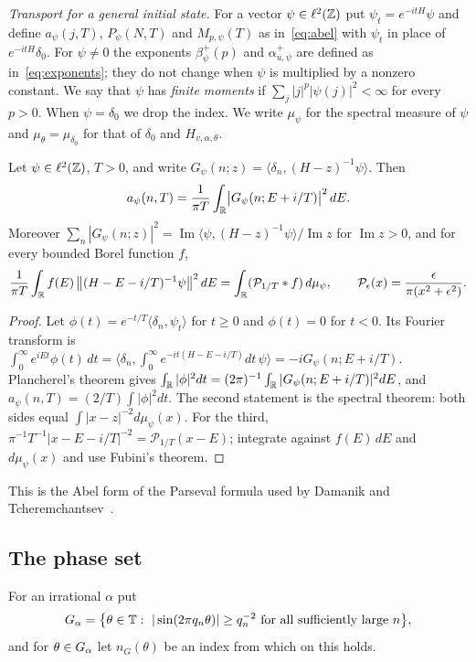 \emph{Transport for a general initial state.} For a vector $\psi\in\ell^2(\mathbb Z)$ put $\psi_t=e^{-itH}\psi$ and define $a_\psi(j,T)$, $P_\psi(N,T)$ and $M_{p,\psi}(T)$ as in~\eqref{eq:abel} with $\psi_t$ in place of $e^{-itH}\delta_0$. For $\psi\ne0$ the exponents $\beta^+_\psi(p)$ and $\alpha^+_{u,\psi}$ are defined as in~\eqref{eq:exponents}; they do not change when $\psi$ is multiplied by a nonzero constant. We say that $\psi$ has \emph{finite moments} if $\sum_j|j|^p|\psi(j)|^2<\infty$ for every $p>0$. When $\psi=\delta_0$ we drop the index. We write $\mu_\psi$ for the spectral measure of $\psi$ and $\mu_\theta=\mu_{\delta_0}$ for that of $\delta_0$ and $H_{v,\alpha,\theta}$.

\begin{lemma}[Parseval]\label{lem:parseval}
Let $\psi\in\ell^2(\mathbb Z)$, $T>0$, and write $G_\psi(n;z)=\langle\delta_n,(H-z)^{-1}\psi\rangle$. Then
\[
a_\psi(n,T)=\frac1{\pi T}\int_\mathbb R\bigl|G_\psi(n;E+i/T)\bigr|^2\,dE .
\]
Moreover $\sum_n|G_\psi(n;z)|^2=\operatorname{Im}\langle\psi,(H-z)^{-1}\psi\rangle/\operatorname{Im}z$ for $\operatorname{Im}z>0$, and for every bounded Borel function $f$,
\[
\frac1{\pi T}\int_\mathbb R f(E)\,\bigl\|(H-E-i/T)^{-1}\psi\bigr\|^2\,dE=\int_\mathbb R(\mathcal P_{1/T}*f)\,d\mu_\psi,\qquad \mathcal P_\epsilon(x)=\frac{\epsilon}{\pi(x^2+\epsilon^2)} .
\]
\end{lemma}

\begin{proof}
Let $\phi(t)=e^{-t/T}\langle\delta_n,\psi_t\rangle$ for $t\ge0$ and $\phi(t)=0$ for $t<0$. Its Fourier transform is $\int_0^\infty e^{iEt}\phi(t)\,dt=\langle\delta_n,\int_0^\infty e^{-it(H-E-i/T)}dt\,\psi\rangle=-iG_\psi(n;E+i/T)$. Plancherel's theorem gives $\int_\mathbb R|\phi|^2dt=(2\pi)^{-1}\int_\mathbb R|G_\psi(n;E+i/T)|^2dE$, and $a_\psi(n,T)=(2/T)\int|\phi|^2dt$. The second statement is the spectral theorem: both sides equal $\int|x-z|^{-2}d\mu_\psi(x)$. For the third, $\pi^{-1}T^{-1}|x-E-i/T|^{-2}=\mathcal P_{1/T}(x-E)$; integrate against $f(E)\,dE$ and $d\mu_\psi(x)$ and use Fubini's theorem.
\end{proof}

This is the Abel form of the Parseval formula used by Damanik and Tcheremchantsev~\cite{DT2007}.

\subsection{The phase set}

For an irrational $\alpha$ put
\begin{equation}\label{eq:Ga}
G_\alpha=\bigl\{\theta\in\mathbb T:\ |\sin(2\pi q_n\theta)|\ge q_n^{-2}\ \text{for all sufficiently large }n\bigr\},
\end{equation}
and for $\theta\in G_\alpha$ let $n_G(\theta)$ be an index from which on this holds.

